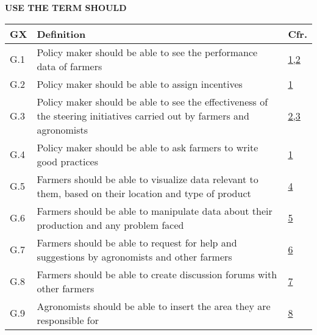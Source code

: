 \textbf{USE THE TERM SHOULD}
\begin{table}[H]
    \setlength\arrayrulewidth{1pt}
    \centering
    \begin{tabular}{|l|m{}|l|}
        \rowcolor{myblue}
        \hline
        \color{white}GX & \color{white}Definition   & \color{white}Cfr.\\
        \hline
        G.1                                               &     Policy maker should be able to see the performance data of farmers &   \hyperref[line:policyMakersPrivileges]{1,2} \\
        \hline
        G.2                                                      &  Policy maker should be able to assign incentives   &    \hyperref[line:policyMakersPrivileges]{1}\\
        \hline
        G.3                                     &  Policy maker should be able to see the effectiveness of the steering initiatives carried out by farmers and agronomists  &   \hyperref[line:policyMakersPrivileges]{2,3} \\
        \hline
        G.4                                              &   Policy maker should be able to ask farmers to write good practices      &   \hyperref[line:policyMakersPrivileges]{1} \\
        \hline
        G.5                                  &   Farmers should be able to visualize data relevant to them, based on their location and type of product   &   \hyperref[line:farmersPrivileges]{4} \\
        \hline
        G.6                                                      &  Farmers should be able to manipulate data about their production and any problem faced   &    \hyperref[line:farmersPrivileges]{5}\\%
        \hline
        G.7                                               &     Farmers should be able to request for help and suggestions by agronomists and other farmers &   \hyperref[line:farmersPrivileges]{6} \\
        \hline
        G.8                                              &   Farmers should be able to create discussion forums with other farmers     &   \hyperref[line:farmersPrivileges]{7} \\
        \hline
        G.9                                  &   Agronomists should be able to insert the area they are responsible for   &   \hyperref[line:agronomistPrivileges]{8} \\

\end{tabular}
\end{table}
